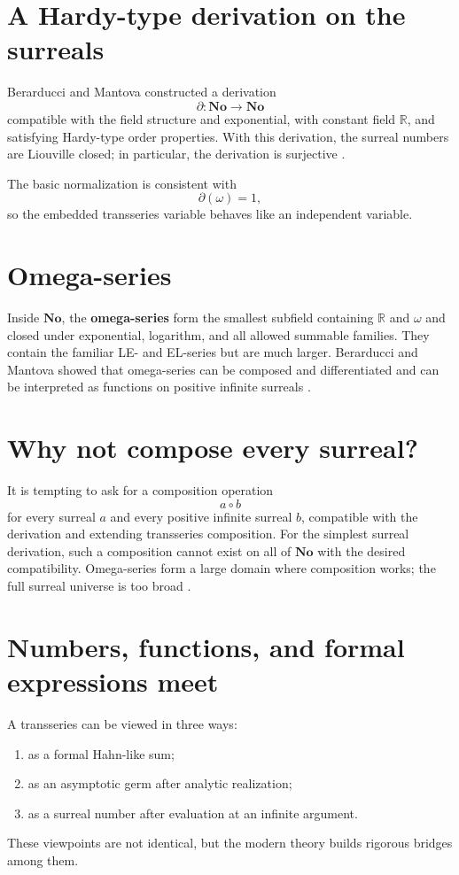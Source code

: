 \documentclass[11pt,openany]{book}
\theoremstyle{plain}
\theoremstyle{definition}
\theoremstyle{remark}
\newcommand{\R}{\mathbb{R}}
\newcommand{\defterm}[1]{\textbf{#1}}
\begin{document}
\section{A Hardy-type derivation on the surreals}
Berarducci and Mantova constructed a derivation
\[
  \partial:\mathbf{No}\to\mathbf{No}
\]
compatible with the field structure and exponential, with constant field $\R$, and satisfying Hardy-type order properties. With this derivation, the surreal numbers are Liouville closed; in particular, the derivation is surjective \cite{BM2018}.

The basic normalization is consistent with
\[
  \partial(\omega)=1,
\]
so the embedded transseries variable behaves like an independent variable.

\section{Omega-series}
Inside $\mathbf{No}$, the \defterm{omega-series} form the smallest subfield containing $\R$ and $\omega$ and closed under exponential, logarithm, and all allowed summable families. They contain the familiar LE- and EL-series but are much larger. Berarducci and Mantova showed that omega-series can be composed and differentiated and can be interpreted as functions on positive infinite surreals \cite{BM2019}.

\section{Why not compose every surreal?}
It is tempting to ask for a composition operation
\[
  a\circ b
\]
for every surreal $a$ and every positive infinite surreal $b$, compatible with the derivation and extending transseries composition. For the simplest surreal derivation, such a composition cannot exist on all of $\mathbf{No}$ with the desired compatibility. Omega-series form a large domain where composition works; the full surreal universe is too broad \cite{BM2019}.

\section{Numbers, functions, and formal expressions meet}
A transseries can be viewed in three ways:
\begin{enumerate}
\item as a formal Hahn-like sum;
\item as an asymptotic germ after analytic realization;
\item as a surreal number after evaluation at an infinite argument.
\end{enumerate}
These viewpoints are not identical, but the modern theory builds rigorous bridges among them.
\end{document}
